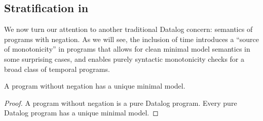 
\subsection{Stratification in {\large{\bf\slang}}}

We now turn our attention to another traditional Datalog concern: semantics of
programs with negation.  As we will see, the inclusion of time introduces a
``source of monotonicity'' in programs that allows for clean minimal model
semantics in some surprising cases, and enables purely syntactic monotonicity
checks for a broad class of temporal programs.




\begin{lemma} \label{lemma:no-neg-unique}
%
A \slang program without negation 
has a unique minimal model.
%
\end{lemma}

\begin{proof} 
%
A \slang program without negation 
is a pure Datalog
program.  Every pure Datalog program has a unique minimal model. 
%
\end{proof}


